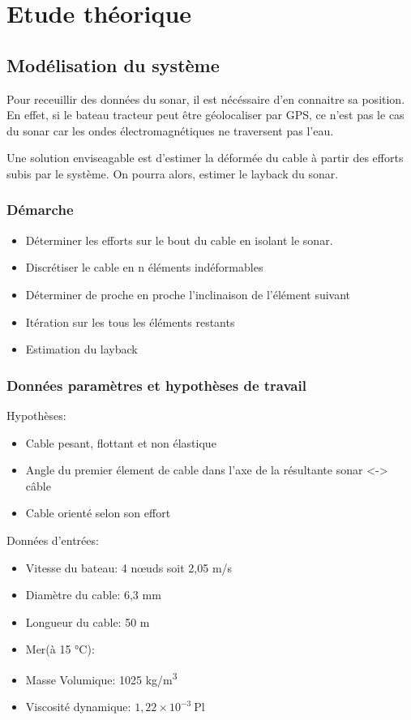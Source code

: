 \documentclass[12pt,a4paper]{report}
\begin{document}
\chapter{Etude théorique}

\section{Modélisation du système}


Pour receuillir des données du sonar, il est nécéssaire d'en connaitre sa position. En effet, si le bateau tracteur
peut être géolocaliser par GPS, ce n'est pas le cas du sonar car les ondes électromagnétiques ne traversent pas l'eau.

Une solution enviseagable est d'estimer la déformée du cable à partir des efforts subis par le système.
On pourra alors, estimer le layback du sonar.

\subsection{Démarche}

\begin{itemize}

  \item Déterminer les efforts sur le bout du cable en isolant le sonar.
  \item Discrétiser le cable en n éléments indéformables
  \item Déterminer de proche en proche l'inclinaison de l'élément suivant
  \item Itération sur les tous les éléments restants
  \item Estimation du layback


\end{itemize}

\subsection{Données paramètres et hypothèses de travail}

Hypothèses:
\begin{itemize}
    \item Cable pesant, flottant et non élastique
    \item Angle du premier élement de cable dans l'axe de la résultante sonar <-> câble
    \item Cable orienté selon son effort
\end{itemize}
Données d'entrées:
\begin{itemize}
  \item Vitesse du bateau: 4 nœuds soit 2,05 m/s
  \item Diamètre du cable: 6,3 mm
  \item Longueur du cable: 50 m
  \item Mer(à 15 °C):
  \item Masse Volumique: 1025 kg/m\textsuperscript{3}
  \item Viscosité dynamique: \( 1{,}22 \times 10^{-3}~\text{Pl} \)
\end{itemize}
\end{document}
